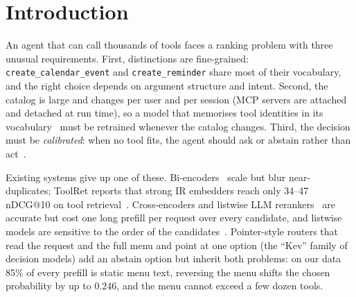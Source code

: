 \documentclass[sigconf,review,anonymous]{acmart}
\begin{document}
\section{Introduction}
An agent that can call thousands of tools faces a ranking problem with three unusual requirements.
First, distinctions are fine-grained: \texttt{create\_calendar\_event} and \texttt{create\_reminder} share most of their vocabulary, and the right choice depends on argument structure and intent.
Second, the catalog is large and changes per user and per session (MCP servers are attached and detached at run time), so a model that memorises tool identities in its vocabulary~\cite{wang2025toolgen} must be retrained whenever the catalog changes.
Third, the decision must be \emph{calibrated}: when no tool fits, the agent should ask or abstain rather than act~\cite{ross2025when2call,patil2025bfcl}.

Existing systems give up one of these.
Bi-encoders~\cite{shi2025toolret,lu2025tooldenroll} scale but blur near-duplicates; ToolRet reports that strong IR embedders reach only 34--47 nDCG@10 on tool retrieval~\cite{shi2025toolret}.
Cross-encoders and listwise LLM rerankers~\cite{sun2023rankgpt,reddy2024first,wang2025jinav3} are accurate but cost one long prefill per request over every candidate, and listwise models are sensitive to the order of the candidates~\cite{liu2024lost,zheng2024pride}.
Pointer-style routers that read the request and the full menu and point at one option (the ``Kev'' family of decision models) add an abstain option but inherit both problems: on our data 85\% of every prefill is static menu text, reversing the menu shifts the chosen probability by up to $0.246$, and the menu cannot exceed a few dozen tools.
\end{document}
